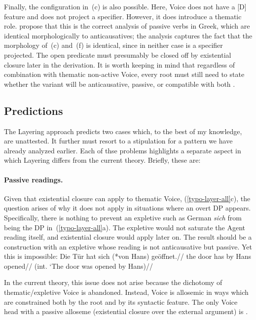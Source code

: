 Finally, the configuration in~(\lastx c) is also possible. Here, Voice does not have a [D] feature and does not project a specifier. However, it does introduce a thematic role. \cite{layering15} propose that this is the correct analysis of passive verbs in Greek, which are identical morphologically to anticausatives; the analysis captures the fact that the morphology of~(\lastx c) and~(\lastx f) is identical, since in neither case is a specifier projected. The open predicate must presumably be closed off by existential closure later in the derivation. It is worth keeping in mind that regardless of combination with thematic non-active Voice, every root must still need to state whether the  variant will be anticausative, passive, or compatible with both \citep[88]{alexiadouanagnostopoulou04,layering15}.


	\subsection{Predictions}
The Layering approach predicts two cases which, to the best of my knowledge, are unattested. It further must resort to a stipulation for a pattern we have already analyzed earlier. Each of thse problems highlights a separate aspect in which Layering differs from the current theory. Briefly, these are:

\paragraph*{Passive readings.} Given that existential closure can apply to thematic Voice, (\ref{typo-layer-all}c), the question arises of why it does not apply in situations where an overt DP appears. Specifically, there is nothing to prevent an expletive such as German \emph{sich} from being the DP in~(\ref{typo-layer-all}a). The expletive would not saturate the Agent reading itself, and existential closure would apply later on. The result should be a construction with an expletive whose reading is not anticausative but passive. Yet this is impossible:
\ex \begingl
	\gla Die T\"ur hat sich (*von Hans) ge\"offnet.//
	\glb the door has  by Hans opened//
	\glft (int. `The door was opened by Hans)//
	\endgl
\xe

In the current theory, this issue does not arise because the dichotomy of thematic/expletive Voice is abandoned. Instead, Voice is allosemic in ways which are constrained both by the root and by its syntactic feature. The only Voice head with a passive alloseme (existential closure over the external argument) is {\vz}.

